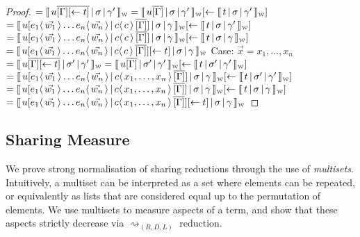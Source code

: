\documentclass[a4paper,UKenglish,cleveref, autoref]{lipics-v2019}
\newcommand{\share}[3]{#1 [#2 \leftarrow #3]}
\newcommand{\dist}[5]{#1 [ #2 \, \vert \, \fakedist{#4}{#5} \, #3 ]}
\newcommand{\fakedist}[2]{#1 \langle \, #2 \, \rangle}
\newcommand{\weaksymbol}{\mbox{\tiny $\mathcal{W}$}}
\newcommand{\readweakwmap}[3]{\llbracket \, #1 \, \vert \, #2 \, \vert \, #3  \, \rrbracket_{\weaksymbol} }
\begin{document}
\begin{proof}
\newline
$= \readweakwmap{u \overline{[\Gamma] \share{}{}{t}}}{\sigma}{\gamma'} = \readweakwmap{u \overline{[\Gamma]}}{\sigma}{\gamma'} \share{}{}{\readweakwmap{t}{\sigma}{\gamma'}}$
\newline
$= \readweakwmap{\dist{u}{\fakedist{e_{1}}{\vec{w_{1}}} \dots \fakedist{e_{n}}{\vec{w_{n}}}}{\overline{[\Gamma]}}{c}{c}}{\sigma}{\gamma} \share{}{}{\readweakwmap{t}{\sigma}{\gamma'}}$
\newline
$= \readweakwmap{\dist{u}{\fakedist{e_{1}}{\vec{w_{1}}} \dots \fakedist{e_{n}}{\vec{w_{n}}}}{\overline{[\Gamma]}}{c}{c}}{\sigma}{\gamma} \share{}{}{\readweakwmap{t}{\sigma}{\gamma}}$
\newline
$= \readweakwmap{\dist{u}{\fakedist{e_{1}}{\vec{w_{1}}} \dots \fakedist{e_{n}}{\vec{w_{n}}}}{\overline{[\Gamma]}}{c}{c} \share{}{}{t}}{\sigma}{\gamma}$
\newline
\newline
\indent Case: $\vec{x} = x_{1}, \dots, x_{n}$
\newline
$= \readweakwmap{u \overline{[\Gamma] \share{}{}{t}}}{\sigma'}{\gamma'} = \readweakwmap{u \overline{[\Gamma]}}{\sigma'}{\gamma'} \share{}{}{\readweakwmap{t}{\sigma'}{\gamma'}}$
\newline
$= \readweakwmap{\dist{u}{\fakedist{e_{1}}{\vec{w_{1}}} \dots \fakedist{e_{n}}{\vec{w_{n}}}}{\overline{[\Gamma]}}{c}{x_{1}, \dots, x_{n}}}{\sigma}{\gamma} \share{}{}{\readweakwmap{t}{\sigma'}{\gamma'}}$
\newline
$= \readweakwmap{\dist{u}{\fakedist{e_{1}}{\vec{w_{1}}} \dots \fakedist{e_{n}}{\vec{w_{n}}}}{\overline{[\Gamma]}}{c}{x_{1}, \dots, x_{n}}}{\sigma}{\gamma} \share{}{}{\readweakwmap{t}{\sigma}{\gamma}}$
\newline
$= \readweakwmap{\dist{u}{\fakedist{e_{1}}{\vec{w_{1}}} \dots \fakedist{e_{n}}{\vec{w_{n}}}}{\overline{[\Gamma]}}{c}{x_{1}, \dots, x_{n}} \share{}{}{t}}{\sigma}{\gamma}$
\end{proof}

\subsection{Sharing Measure}

We prove strong normalisation of sharing reductions through the use of \emph{multisets}. Intuitively, a multiset can be interpreted as a set where elements can be repeated, or equivalently as lists that are considered equal up to the permutation of elements. We use multisets to measure aspects of a term, and show that these aspects strictly decrease via $\rightsquigarrow_{(R, D, L)}$ reduction. 
\end{document}
